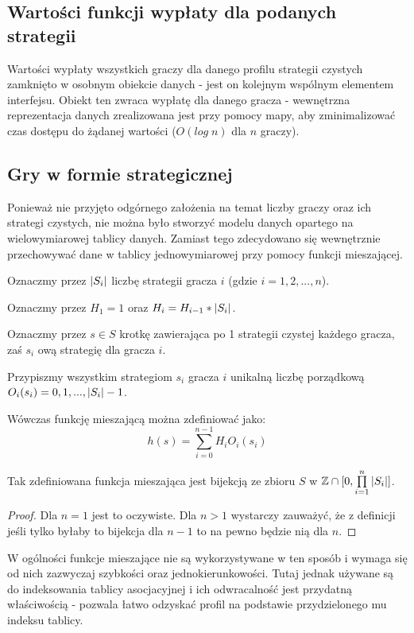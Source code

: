 \documentclass[polish]{standalone}
\begin{document}
\subsection{Wartości funkcji wypłaty dla podanych strategii}

Wartości wypłaty wszystkich graczy dla danego profilu strategii czystych zamknięto w osobnym obiekcie danych - jest on
kolejnym wspólnym elementem interfejsu. Obiekt ten zwraca wypłatę dla danego gracza - wewnętrzna reprezentacja danych
zrealizowana jest przy pomocy mapy, aby zminimalizować czas dostępu do żądanej wartości ($O(log\;n)$ dla $n$ graczy).

\subsection{Gry w formie strategicznej}

Ponieważ nie przyjęto odgórnego założenia na temat liczby graczy oraz ich strategi czystych, nie można było stworzyć
modelu danych opartego na wielowymiarowej tablicy danych. Zamiast tego zdecydowano się wewnętrznie przechowywać dane
w tablicy jednowymiarowej przy pomocy funkcji mieszającej.

Oznaczmy przez $|S_i|$ liczbę strategii gracza $i$ (gdzie $i = 1, 2, ..., n$).

Oznaczmy przez $H_1 = 1$ oraz $H_i = H_{i-1} * |S_i|$.

Oznaczmy przez $s \in S$ krotkę zawierająca po 1 strategii czystej każdego gracza, zaś $s_i$ ową strategię
dla gracza $i$.

Przypiszmy wszystkim strategiom $s_i$ gracza $i$ unikalną liczbę porządkową $O_i(s_i) = 0, 1, ..., |S_i|-1$.

Wówczas funkcję mieszającą można zdefiniować jako:
$$h(s) = \sum\limits_{i=0}^{n-1} H_i O_i(s_i)$$

\begin{theorem}
Tak zdefiniowana funkcja mieszająca jest bijekcją ze zbioru $S$ w $ \mathbb{Z} \cap [0, \prod\limits_{i=1}^{n} |S_i|] $.
\end{theorem}

\begin{proof}
Dla $n = 1$ jest to oczywiste. Dla $n > 1$ wystarczy zauważyć, że z definicji jeśli tylko byłaby to bijekcja dla $n-1$
to na pewno będzie nią dla $n$.
\end{proof}

W ogólności funkcje mieszające nie są wykorzystywane w ten sposób i wymaga się od nich zazwyczaj szybkości oraz
jednokierunkowości. Tutaj jednak używane są do indeksowania tablicy asocjacyjnej i ich odwracalność jest przydatną
właściwością - pozwala łatwo odzyskać profil na podstawie przydzielonego mu indeksu tablicy.
\end{document}
